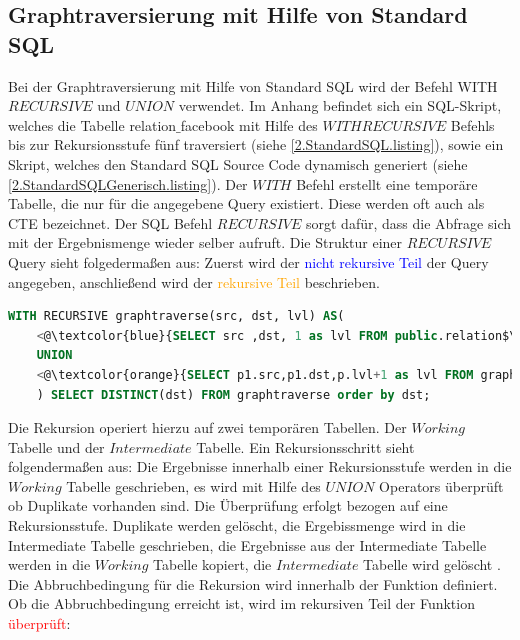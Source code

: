 \subsection{Graphtraversierung mit Hilfe von Standard \ac{SQL}}
\label{2.postgresStandardSQL.subsection}
Bei der Graphtraversierung mit Hilfe von Standard \ac{SQL} wird der Befehl WITH $RECURSIVE$ und $UNION$ verwendet.
Im Anhang befindet sich ein SQL-Skript, welches die Tabelle relation$\_$facebook mit Hilfe des $WITH RECURSIVE$ Befehls bis zur Rekursionsstufe fünf traversiert (siehe \ref{2.StandardSQL.listing}),
sowie ein Skript, welches den Standard SQL Source Code dynamisch generiert (siehe \ref{2.StandardSQLGenerisch.listing}).
Der $WITH$ Befehl erstellt eine temporäre Tabelle, die nur für die angegebene Query existiert.
Diese werden oft auch als \ac{CTE} bezeichnet.
Der SQL Befehl $RECURSIVE$ sorgt dafür, dass die Abfrage sich mit der Ergebnismenge wieder selber aufruft.
Die Struktur einer $RECURSIVE$ Query sieht folgedermaßen aus:
Zuerst wird der \textcolor{blue}{nicht rekursive Teil} der Query angegeben, anschließend wird der \textcolor{orange}{rekursive Teil} beschrieben.
\begin{lstlisting}[language=SQL,caption = Rekursiver und nicht rekursiver Teil,frame=single, label={2.StrukturderQuery.listing} ]
    WITH RECURSIVE graphtraverse(src, dst, lvl) AS(
    <@\textcolor{blue}{SELECT src ,dst, 1 as lvl FROM public.relation$\_$facebook WHERE src =765} @>
    UNION
    <@\textcolor{orange}{SELECT p1.src,p1.dst,p.lvl+1 as lvl FROM graphtraverse p, relation$\_$facebook p1 WHERE p1.src IN ( p.dst ) and lvl<5} @>
    ) SELECT DISTINCT(dst) FROM graphtraverse order by dst;
\end{lstlisting}
Die Rekursion operiert hierzu auf zwei temporären Tabellen.
Der $Working$ Tabelle und der $Intermediate$ Tabelle.
Ein Rekursionsschritt sieht folgendermaßen aus:
Die Ergebnisse innerhalb einer Rekursionsstufe werden in die $Working$ Tabelle geschrieben, es wird mit Hilfe des $UNION$ Operators überprüft ob Duplikate vorhanden sind.
Die Überprüfung erfolgt bezogen auf eine Rekursionsstufe.
Duplikate werden gelöscht, die Ergebissmenge wird in die Intermediate Tabelle geschrieben, die Ergebnisse aus der Intermediate Tabelle werden in die $Working$ Tabelle kopiert, die $Intermediate$ Tabelle wird gelöscht \cite{postgreswithrecursive}.
Die Abbruchbedingung für die Rekursion wird innerhalb der Funktion definiert.
Ob die Abbruchbedingung erreicht ist, wird im rekursiven Teil der Funktion \textcolor{red}{überprüft}:
